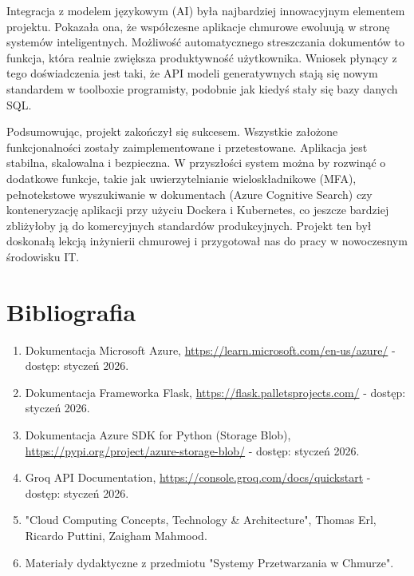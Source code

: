 \documentclass[12pt,a4paper]{article}
\begin{document}
	Integracja z modelem językowym (AI) była najbardziej innowacyjnym elementem projektu. Pokazała ona, że współczesne aplikacje chmurowe ewoluują w stronę systemów inteligentnych. Możliwość automatycznego streszczania dokumentów to funkcja, która realnie zwiększa produktywność użytkownika. Wniosek płynący z tego doświadczenia jest taki, że API modeli generatywnych stają się nowym standardem w toolboxie programisty, podobnie jak kiedyś stały się bazy danych SQL.
	
	Podsumowując, projekt zakończył się sukcesem. Wszystkie założone funkcjonalności zostały zaimplementowane i przetestowane. Aplikacja jest stabilna, skalowalna i bezpieczna. W przyszłości system można by rozwinąć o dodatkowe funkcje, takie jak uwierzytelnianie wieloskładnikowe (MFA), pełnotekstowe wyszukiwanie w dokumentach (Azure Cognitive Search) czy konteneryzację aplikacji przy użyciu Dockera i Kubernetes, co jeszcze bardziej zbliżyłoby ją do komercyjnych standardów produkcyjnych. Projekt ten był doskonałą lekcją inżynierii chmurowej i przygotował nas do pracy w nowoczesnym środowisku IT.
	
	\newpage
	\section{Bibliografia}
	\begin{enumerate}
		\item Dokumentacja Microsoft Azure, \url{https://learn.microsoft.com/en-us/azure/} - dostęp: styczeń 2026.
		\item Dokumentacja Frameworka Flask, \url{https://flask.palletsprojects.com/} - dostęp: styczeń 2026.
		\item Dokumentacja Azure SDK for Python (Storage Blob), \url{https://pypi.org/project/azure-storage-blob/} - dostęp: styczeń 2026.
		\item Groq API Documentation, \url{https://console.groq.com/docs/quickstart} - dostęp: styczeń 2026.
		\item "Cloud Computing Concepts, Technology \& Architecture", Thomas Erl, Ricardo Puttini, Zaigham Mahmood.
		\item Materiały dydaktyczne z przedmiotu "Systemy Przetwarzania w Chmurze".
	\end{enumerate}
	
\end{document}

